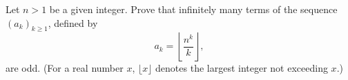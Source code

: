 Let $n > 1$ be a given integer. Prove that infinitely many terms of the sequence $(a_k)_{k \geq 1}$, defined by
\[ a_k = \left\lfloor \frac{n^k}{k} \right\rfloor, \]
are odd. (For a real number $x$, $\lfloor x \rfloor$ denotes the largest integer not exceeding $x$.)
